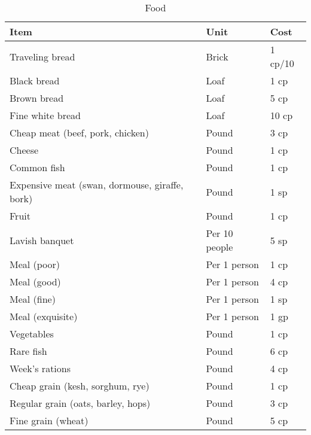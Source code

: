 \documentclass[oneside,11pt,english]{book}
\begin{document}
\begin{table}[hb]
  \centering
  \caption{Food}
  \label{tab:Food}
  \begin{tabu} spread 0pt {*{3}{X[-1]}}
    Item                                           & Unit          & Cost    \\\toprule
    Traveling bread                                & Brick         & 1 cp/10 \\
    Black bread                                    & Loaf          & 1 cp    \\
    Brown bread                                    & Loaf          & 5 cp    \\
    Fine white bread                               & Loaf          & 10 cp   \\
    Cheap meat (beef, pork, chicken)               & Pound         & 3 cp    \\
    Cheese                                         & Pound         & 1 cp    \\
    Common fish                                    & Pound         & 1 cp    \\
    Expensive meat (swan, dormouse, giraffe, bork) & Pound         & 1 sp    \\
    Fruit                                          & Pound         & 1 cp    \\
    Lavish banquet                                 & Per 10 people & 5 sp    \\
    Meal (poor)                                    & Per 1 person  & 1 cp    \\
    Meal (good)                                    & Per 1 person  & 4 cp    \\
    Meal (fine)                                    & Per 1 person  & 1 sp    \\
    Meal (exquisite)                               & Per 1 person  & 1 gp    \\
    Vegetables                                     & Pound         & 1 cp    \\
    Rare fish                                      & Pound         & 6 cp    \\
    Week's rations                                 & Pound         & 4 cp    \\
    Cheap grain (kesh, sorghum, rye)               & Pound         & 1 cp    \\
    Regular grain (oats, barley, hops)             & Pound         & 3 cp    \\
    Fine grain (wheat)                             & Pound         & 5 cp    \\
  \end{tabu}
\end{table}
\end{document}
